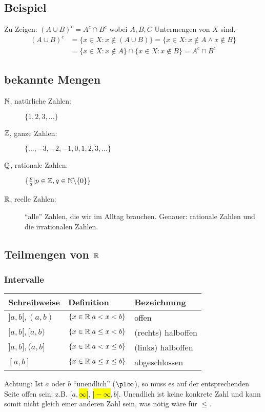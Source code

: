 \begin{multicols}{2}
\subsection{Beispiel}
Zu Zeigen: $(A \cup B)^c = A^c \cap B^c$ wobei $A, B, C$ Untermengen von $X$ sind.
\begin{align*}
(A \cup B)^c &= \{x \in X: x \not\in (A \cup B)\} = \{x \in X: x \not\in A \land x \not\in B\}\\
&= \{x \in X: x \not\in A\} \cap \{x \in X: x \not\in B\} = A^c \cap B^c
\end{align*}

\subsection{bekannte Mengen}
\begin{description}
	\item[$\mathbb{N}$, natürliche Zahlen:] $\{1, 2, 3, \ldots\}$
	\item[$\mathbb{Z}$, ganze Zahlen:] $\{\ldots, -3, -2, -1, 0, 1, 2, 3, \ldots\}$
	\item[$\mathbb{Q}$, rationale Zahlen:] $\{\frac{p}{q} | p \in \mathbb{Z}, q \in \mathbb{N} \backslash \{0\}\}$
	\item[$\mathbb{R}$, reelle Zahlen:] ``alle'' Zahlen, die wir im Alltag brauchen. Genauer: rationale Zahlen und die irrationalen Zahlen.
\end{description}

\subsection{Teilmengen von $\mathbb{R}$}
\subsubsection{Intervalle}
\begin{tabular}{|l|l|l|}\hline
Schreibweise & Definition & Bezeichnung\\\hline
$]a, b[, (a,b)$ & $\{x \in \mathbb{R} | a < x < b\}$ & offen\\\hline
$[a, b[, [a, b)$ & $\{x \in \mathbb{R} | a \leq x < b\}$ & (rechts) halboffen \\\hline
$]a,b], (a, b]$ & $\{x \in \mathbb{R} | a < x \leq b\}$ & (links) halboffen \\\hline
$[a,b]$ & $\{x \in \mathbb{R} | a \leq x \leq b\}$ & abgeschlossen \\\hline
\end{tabular}

Achtung: Ist $a$ oder $b$ ``unendlich'' ($\pl \infty$), so muss es auf der entsprechenden Seite offen sein: z.B. $[a, $\hl{$\infty[$}, \hl{$]-\infty$}$, b[$.
Unendlich ist keine konkrete Zahl und kann somit nicht gleich einer anderen Zahl sein, was nötig wäre für $\leq$.


\end{multicols}
